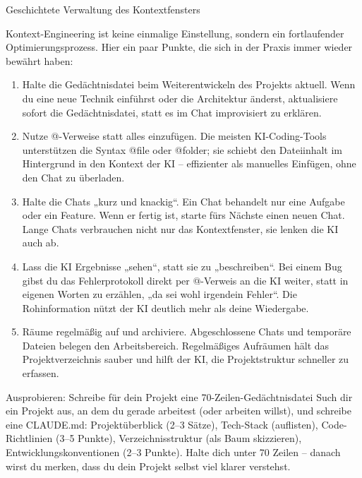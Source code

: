 \begin{center}\small\color{gray}Geschichtete Verwaltung des Kontextfensters\end{center}


Kontext-Engineering ist keine einmalige Einstellung, sondern ein fortlaufender Optimierungsprozess. Hier ein paar Punkte, die sich in der Praxis immer wieder bewährt haben:

\begin{enumerate}
  \item Halte die Gedächtnisdatei beim Weiterentwickeln des Projekts aktuell. Wenn du eine neue Technik einführst oder die Architektur änderst, aktualisiere sofort die Gedächtnisdatei, statt es im Chat improvisiert zu erklären.
  \item Nutze @-Verweise statt alles einzufügen. Die meisten KI-Coding-Tools unterstützen die Syntax @file oder @folder; sie schiebt den Dateiinhalt im Hintergrund in den Kontext der KI – effizienter als manuelles Einfügen, ohne den Chat zu überladen.
  \item Halte die Chats „kurz und knackig“. Ein Chat behandelt nur eine Aufgabe oder ein Feature. Wenn er fertig ist, starte fürs Nächste einen neuen Chat. Lange Chats verbrauchen nicht nur das Kontextfenster, sie lenken die KI auch ab.
  \item Lass die KI Ergebnisse „sehen“, statt sie zu „beschreiben“. Bei einem Bug gibst du das Fehlerprotokoll direkt per @-Verweis an die KI weiter, statt in eigenen Worten zu erzählen, „da sei wohl irgendein Fehler“. Die Rohinformation nützt der KI deutlich mehr als deine Wiedergabe.
  \item Räume regelmäßig auf und archiviere. Abgeschlossene Chats und temporäre Dateien belegen den Arbeitsbereich. Regelmäßiges Aufräumen hält das Projektverzeichnis sauber und hilft der KI, die Projektstruktur schneller zu erfassen.
\end{enumerate}

\begin{tcbpractice}{Ausprobieren: Schreibe für dein Projekt eine 70-Zeilen-Gedächtnisdatei}
Such dir ein Projekt aus, an dem du gerade arbeitest (oder arbeiten willst), und schreibe eine CLAUDE.md: Projektüberblick (2–3 Sätze), Tech-Stack (auflisten), Code-Richtlinien (3–5 Punkte), Verzeichnisstruktur (als Baum skizzieren), Entwicklungskonventionen (2–3 Punkte). Halte dich unter 70 Zeilen – danach wirst du merken, dass du dein Projekt selbst viel klarer verstehst.

\end{tcbpractice}

